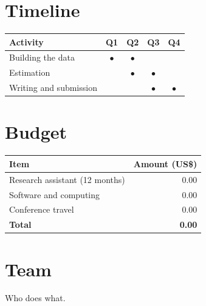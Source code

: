 \documentclass[12pt,letterpaper]{article}
\begin{document}
\section{Timeline}
\begin{table}[h]
  \centering
  \begin{tabular}{lcccc}
    \toprule
    Activity & Q1 & Q2 & Q3 & Q4 \\
    \midrule
    Building the data & $\bullet$ & $\bullet$ & & \\
    Estimation & & $\bullet$ & $\bullet$ & \\
    Writing and submission & & & $\bullet$ & $\bullet$ \\
    \bottomrule
  \end{tabular}
\end{table}

\section{Budget}
\begin{table}[h]
  \centering
  \begin{tabularx}{0.8\textwidth}{Xr}
    \toprule
    Item & Amount (US\$) \\
    \midrule
    Research assistant (12 months) & 0.00 \\
    Software and computing & 0.00 \\
    Conference travel & 0.00 \\
    \midrule
    \textbf{Total} & \textbf{0.00} \\
    \bottomrule
  \end{tabularx}
\end{table}

\section{Team}
Who does what.



\end{document}
